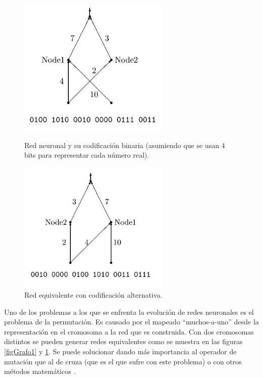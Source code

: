 \documentclass[11pt]{article}
\begin{document}
\begin{titlepage}
\begin{figure}[t]
\begin{minipage}{0.45\textwidth}
    \includegraphics [width=7.20cm]{./img/grafo1.jpg}
  \caption {Red neuronal y su codificaci\'on binaria (asumiendo que se usan 4 bits para representar cada n\'umero real).}\label{figGrafo1}
\end{minipage}
\begin{minipage}{0.10\textwidth}
\hfill
\end{minipage}
\begin{minipage}{0.45\textwidth}
    \includegraphics [width=7.20cm]{./img/grafo2.jpg}
  \caption{Red equivalente con codificaci\'on alternativa.}\label{figGrafo2}
\end{minipage}
\end{figure}

 Uno de los problemas a los que se enfrenta la evoluci\'on de redes neuronales es el problema de la permutaci\'on. Es causado por el mapeado ``muchos-a-uno'' desde la representaci\'on en el cromosoma a la red que es construida. Con dos cromosomas distintos se pueden generar redes equivalentes como se muestra en las figuras \ref{figGrafo1} y \ref{figGrafo2}. Se puede solucionar dando m\'as importancia al operador de mutaci\'on que al de cruza (que es el que sufre con este problema) o con otros m\'etodos matem\'aticos \cite[Gomez, Miikkulainen 2003]{GomezMiikkulainen2003}. 


\end{titlepage}
\end{document}
